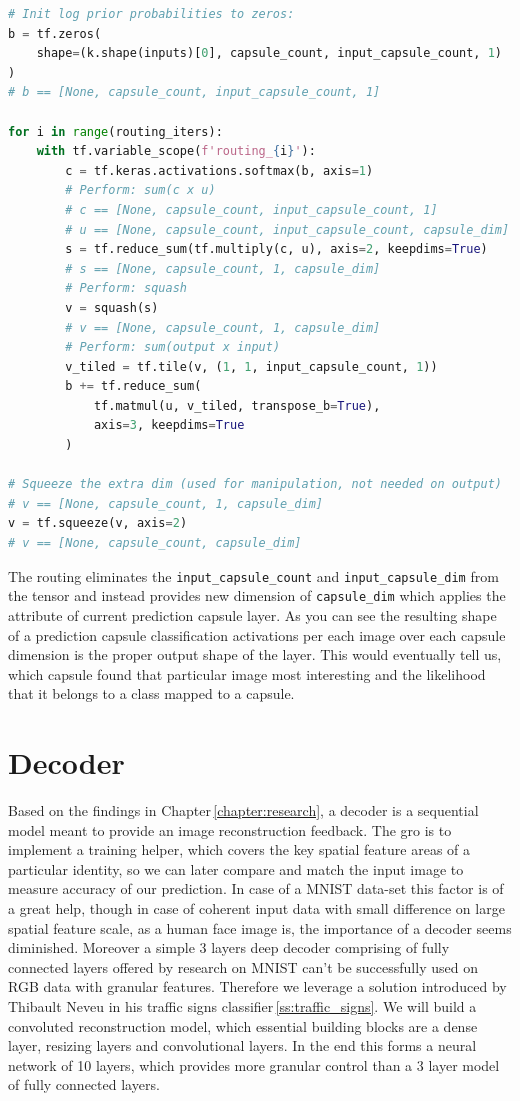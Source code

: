 \begin{lstlisting}[language=Python, caption=Prediction capsule routing]
# Init log prior probabilities to zeros:
b = tf.zeros(
    shape=(k.shape(inputs)[0], capsule_count, input_capsule_count, 1)
)
# b == [None, capsule_count, input_capsule_count, 1]

for i in range(routing_iters):
    with tf.variable_scope(f'routing_{i}'):
        c = tf.keras.activations.softmax(b, axis=1)
        # Perform: sum(c x u)
        # c == [None, capsule_count, input_capsule_count, 1]
        # u == [None, capsule_count, input_capsule_count, capsule_dim]
        s = tf.reduce_sum(tf.multiply(c, u), axis=2, keepdims=True)
        # s == [None, capsule_count, 1, capsule_dim]
        # Perform: squash
        v = squash(s)
        # v == [None, capsule_count, 1, capsule_dim]
        # Perform: sum(output x input)
        v_tiled = tf.tile(v, (1, 1, input_capsule_count, 1))
        b += tf.reduce_sum(
            tf.matmul(u, v_tiled, transpose_b=True),
            axis=3, keepdims=True
        )

# Squeeze the extra dim (used for manipulation, not needed on output)
# v == [None, capsule_count, 1, capsule_dim]
v = tf.squeeze(v, axis=2)
# v == [None, capsule_count, capsule_dim]
\end{lstlisting}

The routing eliminates the \texttt{input\_capsule\_count} and \texttt{input\_capsule\_dim} from the tensor and instead provides new dimension of \texttt{capsule\_dim} which applies the attribute of current prediction capsule layer. As you can see the resulting shape of a prediction capsule classification activations per each image over each capsule dimension is the proper output shape of the layer. This would eventually tell us, which capsule found that particular image most interesting and the likelihood that it belongs to a class mapped to a capsule.

\section{Decoder}

Based on the findings in Chapter\,\ref{chapter:research}, a decoder is a sequential model meant to provide an image reconstruction feedback. The gro is to implement a training helper, which covers the key spatial feature areas of a particular identity, so we can later compare and match the input image to measure accuracy of our prediction. In case of a MNIST data-set this factor is of a great help, though in case of coherent input data with small difference on large spatial feature scale, as a human face image is, the importance of a decoder seems diminished. Moreover a simple 3 layers deep decoder comprising of fully connected layers offered by research on MNIST can't be successfully used on RGB data with granular features. Therefore we leverage a solution introduced by Thibault Neveu in his traffic signs classifier\,\ref{ss:traffic_signs}. We will build a convoluted reconstruction model, which essential building blocks are a dense layer, resizing layers and convolutional layers. In the end this forms a neural network of 10 layers, which provides more granular control than a 3 layer model of fully connected layers.

